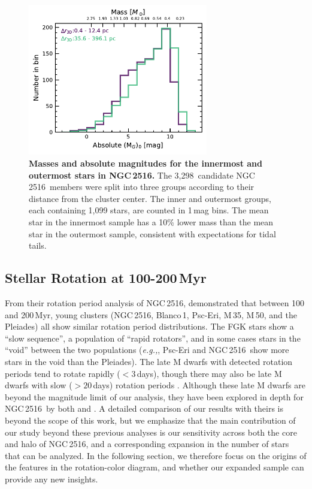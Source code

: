 \documentclass[12pt,twocolumn,tighten]{aastex63}
\newcommand{\cn}{NGC\,2516} %
\newcommand{\nkinematic}{3{,}298} %
\begin{document}
\begin{figure}[t]
	\begin{center}
		\leavevmode
		\includegraphics[width=0.7\textwidth]{f15.pdf}
	\end{center}
	\vspace{-0.7cm}
  \caption{ {\bf Masses and absolute magnitudes for the innermost and
  outermost stars in \cn.} The \nkinematic\ candidate \cn\ members
  were split into three groups according to their distance from the
  cluster center.  The inner and outermost groups, each containing
  1,099 stars, are counted in 1\,mag bins.  The mean star in the
  innermost sample has a 10\% lower mass than the mean star in the
  outermost sample, consistent with expectations for tidal tails.
  \label{fig:massfunction}
	}
\end{figure}



\subsection{Stellar Rotation at 100-200\,Myr}
\label{disc:rotn}

From their rotation period analysis of \cn,
\citet{fritzewski_rotation_2020} demonstrated that
between 100 and 200\,Myr, young clusters (\cn, Blanco\,1, Psc-Eri,
M\,35, M\,50, and the Pleiades) all show similar rotation period
distributions.  The FGK stars show a ``slow sequence'', a population
of ``rapid rotators'', and in some cases stars in the ``void'' between
the two populations ({\it e.g.,}, Psc-Eri and \cn\ show more stars in
the void than the Pleiades).  The late M dwarfs with detected rotation
periods tend to rotate rapidly ($<3$\,days), though there may also be
late M dwarfs with slow ($>20$\,days) rotation periods \citep{stauffer_rotation_2016}.  Although
these late M dwarfs are beyond the magnitude limit of our analysis,
they have been explored in depth for \cn\ by both
\citet{Irwin_NGC2516_2007} and \citet{fritzewski_rotation_2020}.
A detailed comparison of our results with theirs is beyond the
scope of this work, but we emphasize that the main contribution of our
study beyond these previous analyses is our sensitivity
across both the core and halo of \cn, and a
corresponding expansion in the number of stars that can be analyzed.
In the following section, we therefore focus on the origins of the
features in the rotation-color diagram, and whether our expanded
sample can provide any new insights.
\end{document}
